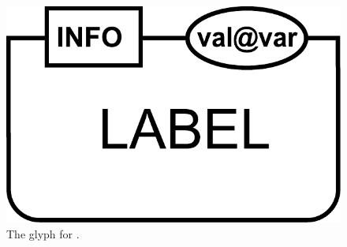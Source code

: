 \begin{figure}[H]
  \centering
  \includegraphics[scale = 0.3]{images/genetic}
  \caption{The \PD glyph for .}
  \label{fig:genetic}
\end{figure}




